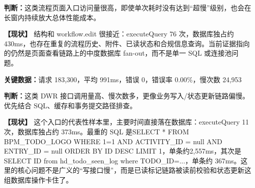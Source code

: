 \noindent\textbf{判断：}这类流程页面入口访问量很高，即使单次耗时没有达到“超慢”级别，也会在长窗内持续放大总体性能成本。\par

\vspace{0.25em}

\noindent\textbf{【现状】} 结构和 workflow.edit 很接近：executeQuery 76 次，数据库独占约 430ms，也存在重复的流程历史、附件、已读状态和合规信息查询。当前证据指向的仍然是页面查看链路上的中度数据库 fan-out，而不是单一 SQL 或连接池问题。\par

\vspace{0.35em}\par

\noindent\textbf{关键数据：}请求 183,300，平均 991ms，错误 0，错误率 0.00\%，慢次数 24,953\par

\noindent\textbf{判断：}这类 DWR 接口调用量高、慢次数多，更像业务写入/状态更新链路偏慢。优先结合 SQL、缓存和事务提交路径排查。\par

\vspace{0.25em}

\noindent\textbf{【现状】} 这个入口的代表性样本里，主要时间直接落在数据库：executeQuery 11 次，数据库独占约 373ms。最重的 SQL 是SELECT * FROM BPM\_TODO\_LOGO WHERE 1=1 AND ACTIVITY\_ID = null AND ENTRY\_ID = null ORDER BY ID DESC LIMIT 1，单条约2,557ms，其次是 SELECT ID from hd\_todo\_seen\_log where TODO\_ID=...，单条约 367ms。这里的核心问题不是广义的“写接口慢”，而是已读标记链路被读前校验和状态更新这组数据库操作卡住了。\par

\vspace{0.35em}\par

